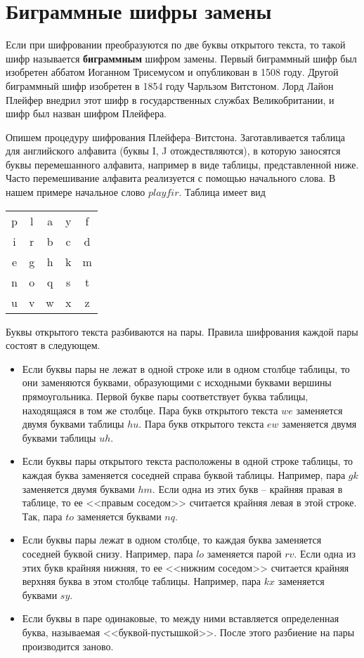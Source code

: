 \section{Биграммные шифры замены}

Если при шифровании преобразуются по две буквы открытого текста, то такой шифр называется \textbf{биграммным} шифром замены. Первый биграммный шифр был изобретен аббатом Иоганном Трисемусом и опубликован в 1508 году. Другой биграммный шифр изобретен в 1854 году Чарльзом Витстоном. Лорд Лайон Плейфер внедрил этот шифр в государственных службах Великобритании, и шифр был назван шифром Плейфера.

Опишем процедуру шифрования Плейфера--Витстона. Заготавливается таблица для английского алфавита (буквы I, J отождествляются), в которую заносятся буквы перемешанного алфавита, например в виде таблицы, представленной ниже. Часто перемешивание алфавита реализуется с помощью начального слова. В нашем примере начальное слово $playfir$. Таблица имеет вид

\begin{center}
    \begin{tabular}{ccccc}
        p & l & a & y & f  \\
        i & r & b & c & d  \\
        e & g & h & k & m  \\
        n & o & q & s & t  \\
        u & v & w & x & z  \\
    \end{tabular}
\end{center}

Буквы открытого текста разбиваются на пары. Правила шифрования каждой пары состоят в следующем.

\begin{itemize}
    \item Если буквы пары не лежат в одной строке или в одном столбце таблицы, то они заменяются буквами, образующими с исходными буквами вершины прямоугольника. Первой букве пары соответствует буква таблицы, находящаяся в том же столбце. Пара букв открытого текста $we$ заменяется двумя буквами таблицы $hu$. Пара букв открытого текста $ew$ заменяется двумя буквами таблицы $uh$.
    \item Если буквы пары открытого текста расположены в одной строке таблицы, то каждая буква заменяется соседней справа буквой таблицы. Например, пара $gk$  заменяется двумя буквами $hm$. Если одна из этих букв -- крайняя правая в таблице, то ее <<правым соседом>> считается крайняя левая в этой строке. Так, пара $to$ заменяется буквами $nq$.
    \item Если буквы пары лежат в одном столбце, то каждая буква заменяется соседней буквой снизу. Например, пара $lo$ заменяется парой $rv$. Если одна из этих букв крайняя нижняя, то ее <<нижним соседом>> считается крайняя верхняя буква в этом столбце таблицы. Например, пара $kx$ заменяется буквами $sy$.
    \item Если буквы в паре одинаковые, то между ними вставляется определенная буква, называемая <<буквой-пустышкой>>. После этого разбиение на пары производится заново.
\end{itemize}

